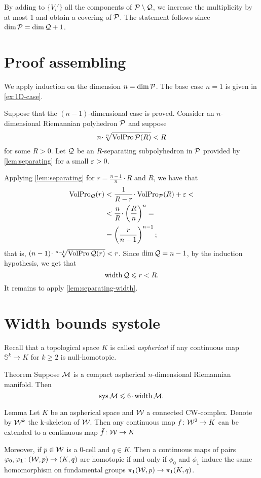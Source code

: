 By adding to  $\{V_i'\}$ all the components of $\mathcal{P}\setminus \mathcal{Q}$,
we increase the multiplicity by at most 1 and obtain a covering of $\mathcal{P}$.
The statement follows since $\dim \spc{P}= \dim \spc{Q}\z+1$.
\qeds

\section*{Proof assembling}

We apply induction on the dimension $n=\operatorname{\rm dim}\nolimits\mathcal{P}$.
The base case $n=1$ is given in \ref{ex:1D-case}.

Suppose that the  $(n-1)$-dimensional case is proved.
Consider an $n$-dimensional Riemannian polyhedron $\mathcal{P}$ and suppose
\[n\cdot \sqrt[n]{\VolPro\spc{P}(R)}< R\]
for some $R>0$.
Let $\mathcal{Q}$ be an $R$-separating subpolyhedron in $\mathcal{P}$ provided by \ref{lem:separating} for a small $\varepsilon>0$.

Applying  \ref{lem:separating} for $r=\tfrac{n-1}n\cdot R$ and $R$, we have that 
\begin{align*}
\VolPro_\spc{Q}(r) &< \frac 1{R-r}\cdot \VolPro_\spc{P}(R)+\eps<
\\
&<\frac {n}{R}\cdot\left(\frac{R}{n}\right)^n=
\\
&=\left(\frac{r}{n-1}\right)^{n-1};
\end{align*}
that is, $(n-1)\cdot \sqrt[n-1]{\VolPro\spc{Q}(r)}< r$.
Since $\operatorname{\rm dim}\nolimits\mathcal{Q}= n-1$, by the induction hypothesis, we get that
\[\operatorname{\rm width}\nolimits\mathcal{Q}\leqslant r<R.\]
It remains to apply \ref{lem:separating-width}.
\qeds





\section{Width bounds systole}

Recall that a topological space $K$ is called \emph{aspherical} if any continuous map $\mathbb{S}^k\to K$ for $k\ge 2$ is null-homotopic.

\begin{thm}{Theorem}\label{thm:sys<width}
Suppose $\mathcal{M}$ is a compact aspherical $n$-dimensional Riemannian manifold.
Then 
\[\sys\spc{M}\le 6 \cdot \width \spc{M}.\]
\end{thm}

\begin{thm}{Lemma}\label{lem:aspherical-homotopy}
Let $K$ be an aspherical space and $\mathcal{W}$ a connected CW-complex.
Denote by $\mathcal{W}^k$ the k-skeleton of $\mathcal{W}$.
Then any continuous map $f\colon\mathcal{W}^2\to K$ can be extended to a continuous map $\bar f\colon\mathcal{W}\to K$

Moreover, if $p\in \mathcal{W}$ is a 0-cell and $q\in K$.
Then a continuous maps of pairs $\varphi_0,\varphi_1\colon(\mathcal{W},p)\to(K,q)$ are homotopic if and only if $\phi_0$ and $\phi_1$ induce the same homomorphism on fundamental groups $\pi_1(\mathcal{W},p)\to\pi_1(K,q)$.
\end{thm}

